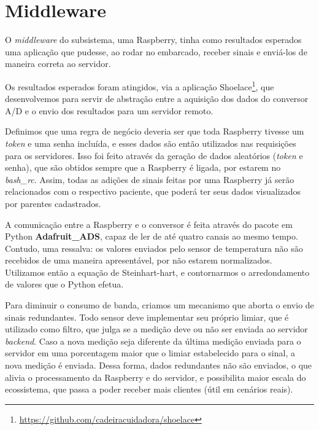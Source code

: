 \section{Middleware}

O \textit{middleware} do subsistema, uma Raspberry, tinha como resultados
esperados uma aplicação que pudesse, ao rodar no embarcado, receber sinais e
enviá-los de maneira correta ao servidor.

Os resultados esperados foram atingidos, via a aplicação
Shoelace\footnote{\url{https://github.com/cadeiracuidadora/shoelace}}, que
desenvolvemos para servir de abstração entre a aquisição dos dados do conversor
A/D e o envio dos resultados para um servidor remoto.

Definimos que uma regra de negócio deveria ser que toda Raspberry tivesse
um \textit{token} e uma senha incluída, e esses dados são então utilizados nas
requisições para os servidores. Isso foi feito através da geração de dados
aleatórios (\textit{token} e senha), que são obtidos sempre que a Raspberry
é ligada, por estarem no \textit{bash\_rc}. Assim, todas as adições de sinais
feitas por uma Raspberry já serão relacionados com o respectivo paciente,
que poderá ter seus dados visualizados por parentes cadastrados.

A comunicação entre a Raspberry e o conversor é feita através do pacote em
Python \textbf{Adafruit\_ADS}, capaz de ler de até quatro canais ao mesmo tempo.
Contudo, uma ressalva: os valores enviados pelo sensor de temperatura não são
recebidos de uma maneira apresentável, por não estarem normalizados. Utilizamos
então a equação de Steinhart-hart, e contornarmos o arredondamento de valores
que o Python efetua.

Para diminuir o consumo de banda, criamos um mecanismo que aborta o envio de
sinais redundantes. Todo sensor deve implementar seu próprio limiar, que é
utilizado como filtro, que julga se a medição deve ou não ser enviada ao
servidor \textit{backend}. Caso a nova medição seja diferente da última
medição enviada para o servidor em uma porcentagem maior que o limiar
estabelecido para o sinal, a nova medição é enviada. Dessa forma, dados
redundantes não são enviados, o que alivia o processamento da Raspberry e do
servidor, e possibilita maior escala do ecossistema, que passa a poder receber
mais clientes (útil em cenários reais).

